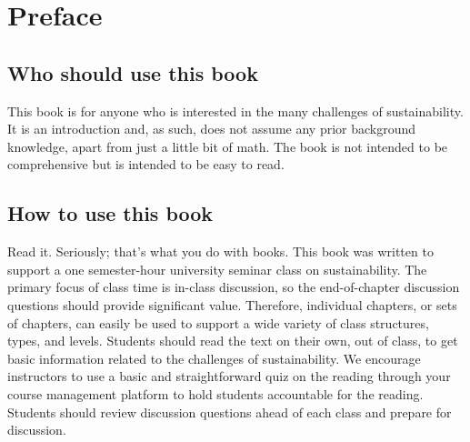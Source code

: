 {
\chapter*{Preface}
\thispagestyle{plain}

\noindent
\section*{Who should use this book} 
This book is for anyone who is interested in the many challenges of 
sustainability.
It is an introduction and, as such, does not assume any prior background knowledge,
apart from just a little bit of math.
The book is not intended to be comprehensive but is intended to be easy to read.\\

\section*{How to use this book} 
Read it. Seriously; that's what you do with books.
This book was written to support a one semester-hour university seminar class
on sustainability. The primary focus of class time is in-class discussion, so 
the end-of-chapter discussion questions should provide significant value. 
Therefore, individual chapters, or sets of chapters, can easily be
used to support a wide variety of class structures, types, and levels.
Students should read the text on their own, out of class, to get 
basic information related to  the challenges of sustainability. 
We encourage instructors to use a basic and straightforward quiz on the reading 
through your course management platform to hold students accountable for the 
reading. 
Students should review discussion questions ahead of each class and 
prepare for discussion. \\

}
